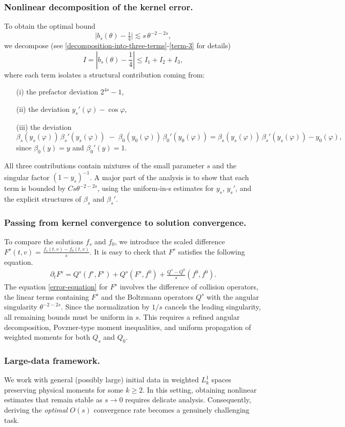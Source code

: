 \documentclass[reqno,10pt]{amsart}
\let\pa=\partial
\def\pa{\partial}
\newcommand{\ben}{\begin{eqnarray}}
\newcommand{\een}{\end{eqnarray}}
\theoremstyle{definition}
\numberwithin{equation}{section}
\begin{document}
\subsubsection{Nonlinear decomposition of the kernel error.}
To obtain the optimal bound
\[
\bigl|b_s(\theta)-\tfrac14\bigr|\lesssim s\,\theta^{-2-2s},
\]
we decompose (see \eqref{decomposition-into-three-terms}-\eqref{term-3} for details)
\[
I=\left|b_s(\theta)-\frac14 \right|\le  I_1 + I_2 + I_3,
\]
where each term isolates a structural contribution coming from:
\begin{itemize}
    \item[(i)] the prefactor  deviation $2^{4s}-1$,
    \item[(ii)] the deviation $y_s'(\varphi)-\cos\varphi$,
    \item[(iii)] the deviation 
    \[
    \beta_s(y_s(\varphi))\,\beta_s'(y_s(\varphi)) 
    \;-\;
    \beta_0(y_0(\varphi))\,\beta_0'(y_0(\varphi))
    = 
    \beta_s(y_s(\varphi))\,\beta_s'(y_s(\varphi)) - y_0(\varphi),
    \]
    since $\beta_0(y)=y$ and $\beta_0'(y)=1$.
\end{itemize}
All three contributions contain mixtures of the small parameter $s$ and the singular factor $(1-y_s)^{-1}$.
A major part of the analysis is to show that each term is bounded by $Cs\theta^{-2-2s}$, using the uniform-in-s estimates for $y_s$, $y_s'$, and the explicit structures of $\beta_s$ and $\beta_s'$.

\subsubsection{Passing from kernel convergence to solution convergence.}
To compare the solutions $f_s$ and $f_0$, we introduce the scaled difference $F^s(t,v)=\frac{f_s(t,v)-f_0(t,v)}{s}$.  
It is easy to check that $F^s$ satisfies the following equation.
\ben\label{error-equation}
\pa_t F^s=Q^s(f^s,F^s)+Q^s(F^s,f^0)+\frac{Q^s-Q^0}{s}(f^0,f^0).
\een
The equation \eqref{error-equation} for $F^s$ involves the difference of collision operators,
the linear terms containing $F^s$ and the Boltzmann operators $Q^s$ with the angular singularity  $ \theta^{-2-2s}$.  
Since the normalization by $1/s$ cancels the leading singularity, all remaining bounds must be uniform in $s$.
This requires a refined angular decomposition, Povzner-type moment inequalities, and uniform propagation of weighted moments for both $Q_s$ and $Q_0$.
\subsubsection{Large-data framework.}
We work with general (possibly large) initial data in weighted $L^1_k$ spaces preserving physical moments for some $k \ge 2$.  In this setting, obtaining nonlinear estimates that remain stable as $s \to 0$ requires delicate analysis.  Consequently, deriving the \textit{optimal} \(O(s)\) convergence rate becomes a genuinely challenging task.
\end{document}
